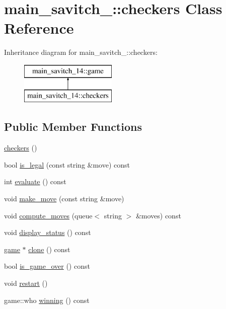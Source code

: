 \hypertarget{classmain__savitch__14_1_1checkers}{}\section{main\+\_\+savitch\+\_\+:\+:checkers Class Reference}
\label{classmain__savitch__14_1_1checkers}
Inheritance diagram for main\+\_\+savitch\+\_\+:\+:checkers\+:\begin{figure}[H]
\begin{center}
\leavevmode
\includegraphics[height=2.000000cm]{classmain__savitch__14_1_1checkers}
\end{center}
\end{figure}
\subsection*{Public Member Functions}
\begin{DoxyCompactItemize}
\item 
\hyperlink{classmain__savitch__14_1_1checkers_ad57de7d84332c511eff8fb0f9dc3e47d}{checkers} ()
\item 
bool \hyperlink{classmain__savitch__14_1_1checkers_a4acc76034673d394a4780e088a90a8e1}{is\+\_\+legal} (const string \&move) const 
\item 
int \hyperlink{classmain__savitch__14_1_1checkers_a6cd8cbb2a6de2874150fc308b1996952}{evaluate} () const 
\item 
void \hyperlink{classmain__savitch__14_1_1checkers_a8a08c0555d5b8c264472cc94a2f007e3}{make\+\_\+move} (const string \&move)
\item 
void \hyperlink{classmain__savitch__14_1_1checkers_aef77bd4e3d64003968b2680e920764f0}{compute\+\_\+moves} (queue$<$ string $>$ \&moves) const 
\item 
void \hyperlink{classmain__savitch__14_1_1checkers_ae2e00d0f12e7fb00f117588db21f0036}{display\+\_\+status} () const 
\item 
\hyperlink{classmain__savitch__14_1_1game}{game} $\ast$ \hyperlink{classmain__savitch__14_1_1checkers_abec8f12b160b460fd09f10db11477f4f}{clone} () const 
\item 
bool \hyperlink{classmain__savitch__14_1_1checkers_aaed95b8aac55b5fdab4a3ba5f9b5e50f}{is\+\_\+game\+\_\+over} () const 
\item 
void \hyperlink{classmain__savitch__14_1_1checkers_ad3ee0adbdabda9136ecd46b958c83d24}{restart} ()
\item 
game\+::who \hyperlink{classmain__savitch__14_1_1checkers_aeea4865e4722e81800e7207f7c954e8f}{winning} () const 
\end{DoxyCompactItemize}
